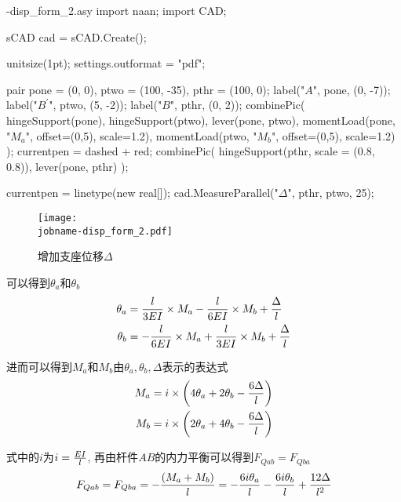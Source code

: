 \begin{filecontents*}{\jobname-disp_form_2.asy}
import naan;
import CAD;

sCAD cad = sCAD.Create();

unitsize(1pt);
settings.outformat = "pdf";

pair pone = (0, 0), ptwo = (100, -35), pthr = (100, 0);
label("$A$", pone, (0, -7));
label("$B^\prime$", ptwo, (5, -2));
label("$B$", pthr, (0, 2));
combinePic(
        hingeSupport(pone),
        hingeSupport(ptwo),
        lever(pone, ptwo),
        momentLoad(pone, "$M_a$", offset=(0,5), scale=1.2),
        momentLoad(ptwo, "$M_b$", offset=(0,5), scale=1.2)
);
currentpen = dashed + red;
combinePic(
    hingeSupport(pthr, scale = (0.8, 0.8)),
    lever(pone, pthr)
);

currentpen = linetype(new real[]);
cad.MeasureParallel("$\Delta$", pthr, ptwo, 25);
\end{filecontents*}

\begin{figure}[H]
\begin{center}
\texttt{[image: \\jobname-disp\_form\_2.pdf]}
\caption{增加支座位移$\Delta$}
\label{fig:disp_form_2}
\end{center}
\end{figure}

可以得到$\theta_a$和$\theta_b$
\begin{subequations}
\begin{align}
\theta_a &= {l\over 3EI}\times M_a - {l\over 6EI}\times M_b + {\Delta\over l}\\
\theta_b &= -{l\over 6EI}\times M_a + {l\over 3EI}\times M_b + {\Delta\over l}
\end{align}
\end{subequations}

进而可以得到$M_a$和$M_b$由$\theta_a, \theta_b, \Delta$表示的表达式
\begin{subequations}
\label{equ:equa}
\begin{align}
M_a &= i\times\left(4\theta_a + 2\theta_b - {6\Delta\over l}\right)\\
M_b &= i\times\left(2\theta_a + 4\theta_b - {6\Delta\over l}\right)
\end{align}
\end{subequations}

式中的$i$为$i = {EI\over l}$, 再由杆件$AB$的内力平衡可以得到$F_{Qab} = F_{Qba}$
\begin{align}
\label{equ:equb}
F_{Qab} = F_{Qba} = -{(M_a + M_b)\over l} = -{6i\theta_a\over l}-{6i\theta_b\over l} + {12\Delta\over l^2}
\end{align}

